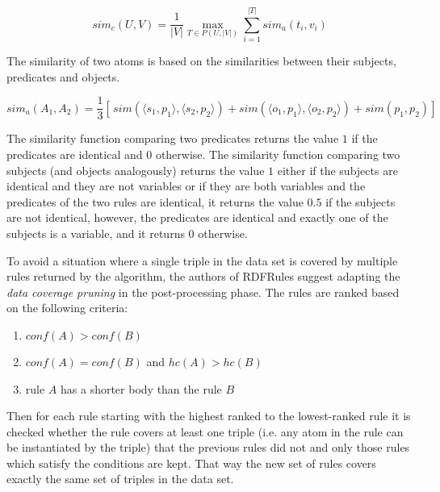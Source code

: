 $$sim_{c}(U,V) = \dfrac{1}{|V|} \max\limits_{T\in P(U,|V|)}\sum_{i = 1}^{|T|} sim_{a}(t_{i},v_{i})$$

The similarity of two atoms is based on the similarities between their subjects, predicates and objects.

$$sim_a(A_{1}, A_{2}) = \frac{1}{3} [ \, sim(\langle s_{1}, p_{1} \rangle, \langle s_{2}, p_{2} \rangle) + sim(\langle o_{1}, p_{1} \rangle, \langle o_{2}, p_{2} \rangle) + sim(p_{1}, p_{2}) ] \,$$

The similarity function comparing two predicates returns the value $1$ if the predicates are identical and $0$ otherwise. The similarity function comparing two subjects (and objects analogously) returns the value $1$ either if the subjects are identical and they are not variables or if they are both variables and the predicates of the two rules are identical, it returns the value $0.5$ if the subjects are not identical, however, the predicates are identical and exactly one of the subjects is a variable, and it returns $0$ otherwise.

To avoid a situation where a single triple in the data set is covered by multiple rules returned by the algorithm, the authors of RDFRules suggest adapting the \textit{data coverage pruning} in the post-processing phase. The rules are ranked based on the following criteria:

\begin{enumerate}
    \item $conf(A) > conf(B)$
    \item $conf(A) = conf(B)$ and $hc(A) > hc(B)$
    \item rule $A$ has a shorter body than the rule $B$
\end{enumerate}

Then for each rule starting with the highest ranked to the lowest-ranked rule it is checked whether the rule covers at least one triple (i.e. any atom in the rule can be instantiated by the triple) that the previous rules did not and only those rules which satisfy the conditions are kept. That way the new set of rules covers exactly the same set of triples in the data set.